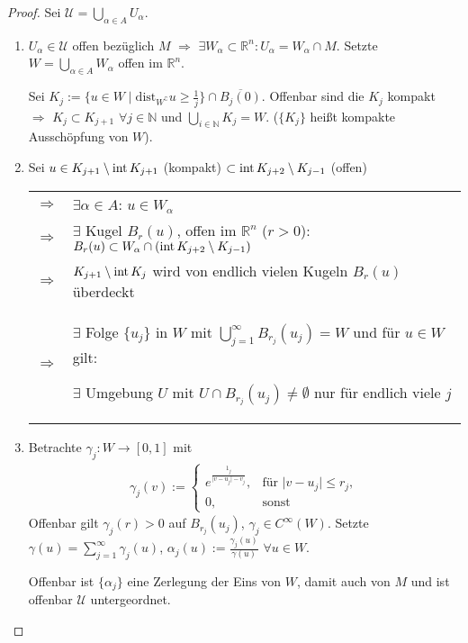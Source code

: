 \begin{proof}
	Sei $\mathcal{U} = \bigcup_{\alpha\in A} U_\alpha$.
	\vspace*{-0.8\baselineskip}
	\begin{enumerate}[label={\alph*)}]
		\item $U_\alpha\in\mathcal{U}$ offen bezüglich $M$ $\Rightarrow$ $\exists W_\alpha\subset\mathbb{R}^n\colon U_\alpha = W_\alpha\cap M$. Setzte $W = \bigcup_{\alpha\in A} W_\alpha$ offen im $\mathbb{R}^n$.
		
		Sei $K_{j} := \{ u\in W \mid \mathrm{dist}_{W^\complement} u \ge \frac{1}{j} \} \cap \overline{B_j(0)}$. Offenbar sind die $K_j$ kompakt \\
		\hspace*{0.5em} $\Rightarrow$ $K_j \subset K_{j+1}$ $\forall j\in\mathbb{N}$ und $\bigcup_{i\in\mathbb{N}} K_j = W$. ($\{K_j\}$ heißt kompakte Ausschöpfung von $W$).
		
		\item Sei $u\in K_{j+1}\setminus \operatorname{int} K_{j+1}$ (kompakt) $\subset \operatorname{int} K_{j+2}\setminus K_{j-1}$ (offen) \\\begin{tabularx}{\linewidth}{r@{$\;\;$}X}
			$\Rightarrow$ & $\exists \alpha\in A$: $u\in W_\alpha$ \\
			$\Rightarrow$ & $\exists$ Kugel $B_r(u)$, offen im $\mathbb{R}^n$ ($r > 0$): $B_r(u) \subset W_\alpha \cap (\operatorname{int} K_{j+2}\setminus K_{j-1})$ \\
			$\Rightarrow$ & $K_{j+1}\setminus \operatorname{int} K_j$ wird von endlich vielen Kugeln $B_r(u)$ überdeckt \\
			$\Rightarrow$ & $\exists$ Folge $\{u_j\}$ in $W$ mit $\bigcup_{j=1}^\infty B_{r_j}(u_j) = W$ und für $u\in W$ gilt:
			
			\hspace*{0.5em}$\exists$ Umgebung $U$ mit $U\cap B_{r_j}(u_j)\neq \emptyset$ nur für endlich viele $j$
		\end{tabularx}
		\item Betrachte $\gamma_j\colon W\to [0,1]$ mit\begin{align*}
			\gamma_j (v) := \begin{cases}
				e^{\frac{1_j}{\vert v - u_j\vert - v_j}}, & \text{für }\vert v - u_j\vert \le r_j,\\
				0, & \text{sonst}
			\end{cases}
		\end{align*}
		Offenbar gilt $\gamma_j(r)>0$ auf $B_{r_j}(u_j)$, $\gamma_j\in C^\infty(W)$. Setzte $\gamma(u) = \sum_{j=1}^\infty \gamma_j(u)$, $\alpha_j(u) := \frac{\gamma_j(u)}{\gamma(u)}$ $\forall u\in W$.
		
		Offenbar ist $\{\alpha_j \}$ eine Zerlegung der Eins von $W$, damit auch von $M$ und ist offenbar $\mathcal{U}$ untergeordnet.
	\end{enumerate}
\end{proof}

